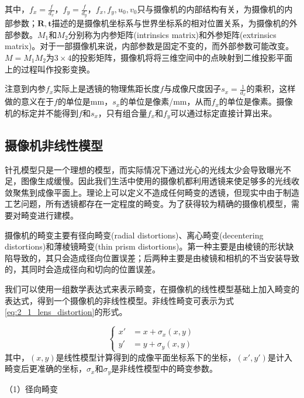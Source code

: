 其中，$f_x=\frac{f}{d_x}$，$f_y=\frac{f}{d_y}$，$f_x, f_y, u_0, v_0$只与摄像机的内部结构有关，为摄像机的内部参数；$\mathbf{R}, \mathbf{t}$描述的是摄像机坐标系与世界坐标系的相对位置关系，为摄像机的外部参数。$M_1$和$M_2$分别称为内参矩阵(intrinsics matrix)和外参矩阵(extrinsics matrix)。对于一部摄像机来说，内部参数是固定不变的，而外部参数可能改变。$M=M_1 M_2$为$3\times 4$的投影矩阵，摄像机将将三维空间中的点映射到二维投影平面上的过程叫作投影变换。

注意到内参$f_x$实际上是透镜的物理焦距长度$f$与成像尺度因子$s_x=\frac{1}{d_x}$的乘积，这样做的意义在于$f$的单位是mm，$s_x$的单位是像素/mm，从而$f_x$的单位是像素。摄像机的标定并不能得到$f$和$s_x$，只有组合量$f_x$和$f_y$可以通过标定直接计算出来。

\subsection{摄像机非线性模型}
针孔模型只是一个理想的模型，而实际情况下通过光心的光线太少会导致曝光不足，图像生成缓慢。因此我们生活中使用的摄像机都利用透镜来使足够多的光线收敛聚焦到成像平面上\cite{GaryBradski2009学习}。理论上可以定义不造成任何畸变的透镜，但现实中由于制造工艺问题，所有透镜都存在一定程度的畸变。为了获得较为精确的摄像机模型，需要对畸变进行建模。

摄像机的畸变主要有径向畸变(radial distortions)\cite{hartley2003multiple}、离心畸变(decentering distortions)\cite{ricolfe2010lens}和薄棱镜畸变(thin prism distortions)\cite{weng1992camera}。第一种主要是由棱镜的形状缺陷导致的，其只会造成径向位置误差；后两种主要是由棱镜和相机的不当安装导致的，其同时会造成径向和切向的位置误差\cite{weng1992camera}。

我们可以使用一组数学表达式来表示畸变，在摄像机的线性模型基础上加入畸变的表达式，得到一个摄像机的非线性模型。非线性畸变可表示为式\ref{eq:2_1_lens_distortion}的形式。

\begin{equation}\label{eq:2_1_lens_distortion}
\left\{
\begin{aligned}
x' &= x + \sigma_x (x,y)  \\
y' &= y + \sigma_y(x,y)
\end{aligned}
\right.
\end{equation}
其中，$(x,y)$是线性模型计算得到的成像平面坐标系下的坐标，$(x',y')$是计入畸变后更准确的坐标，$\sigma_x$和$\sigma_y$是非线性模型中的畸变参数。

（1）径向畸变

